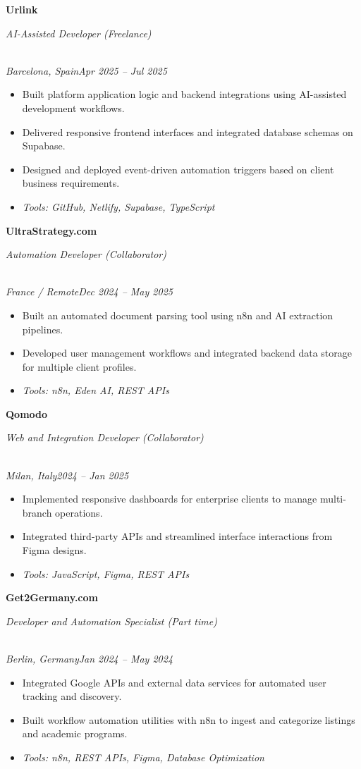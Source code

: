 \documentclass[a4paper,10pt]{article}
\newcommand{\role}[4]{\vspace{3pt}\noindent\hspace{0.6em}\parbox[t]{0.38\textwidth}{\raggedright\textbf{#1}}\hfill\parbox[t]{0.58\textwidth}{\raggedleft\textit{#2}}\\{\textit{#3}\hfill\textit{#4}}\vspace{1pt}}
\begin{document}
\role{Urlink}{AI-Assisted Developer (Freelance)}{Barcelona, Spain}{Apr 2025 -- Jul 2025}
\begin{itemize}
\item Built platform application logic and backend integrations using AI-assisted development workflows.
\item Delivered responsive frontend interfaces and integrated database schemas on Supabase.
\item Designed and deployed event-driven automation triggers based on client business requirements.
\item \textit{Tools: GitHub, Netlify, Supabase, TypeScript}
\end{itemize}

\newpage
\role{UltraStrategy.com}{Automation Developer (Collaborator)}{France / Remote}{Dec 2024 -- May 2025}
\begin{itemize}
\item Built an automated document parsing tool using n8n and AI extraction pipelines.
\item Developed user management workflows and integrated backend data storage for multiple client profiles.
\item \textit{Tools: n8n, Eden AI, REST APIs}
\end{itemize}

\role{Qomodo}{Web and Integration Developer (Collaborator)}{Milan, Italy}{2024 -- Jan 2025}
\begin{itemize}
\item Implemented responsive dashboards for enterprise clients to manage multi-branch operations.
\item Integrated third-party APIs and streamlined interface interactions from Figma designs.
\item \textit{Tools: JavaScript, Figma, REST APIs}
\end{itemize}

\role{Get2Germany.com}{Developer and Automation Specialist (Part time)}{Berlin, Germany}{Jan 2024 -- May 2024}
\begin{itemize}
\item Integrated Google APIs and external data services for automated user tracking and discovery.
\item Built workflow automation utilities with n8n to ingest and categorize listings and academic programs.
\item \textit{Tools: n8n, REST APIs, Figma, Database Optimization}
\end{itemize}
\end{document}
